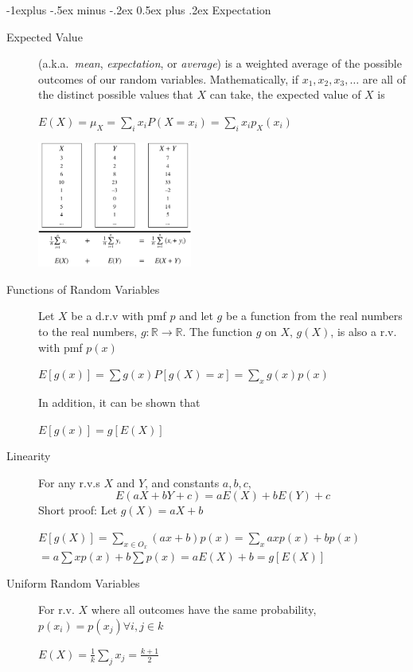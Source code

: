 \documentclass[10pt,landscape]{article}
\makeatletter
\renewcommand{\subsection}{\@startsection{subsection}{2}{0mm}%
                                {-1explus -.5ex minus -.2ex}%
                                {0.5ex plus .2ex}%
                                {\normalfont\normalsize\bfseries}}
\makeatother
\begin{document}
\begin{multicols}{3}
\subsection{Expectation}
\begin{description}

\item[Expected Value] (a.k.a.~\emph{mean}, \emph{expectation}, or \emph{average}) is a weighted average of the possible outcomes of our random variables. Mathematically, if $x_1, x_2, x_3, \dots$ are all of the distinct possible values that $X$ can take, the expected value of $X$ is
\begin{center}
$E(X) = \mu_X = \sum\limits_{i}x_iP(X=x_i) = \sum\limits_{i}x_ip_X(x_i)$
\end{center}

\begin{minipage}{\linewidth}
            \centering
\includegraphics[width=2in]{figures/linearity.pdf}
        \end{minipage}
        
\item[Functions of Random Variables] Let $X$ be a d.r.v with pmf $p$ and let $g$ be a function from the real numbers to the real numbers, $g:\mathbb{R} \rightarrow \mathbb{R}$. The function $g$ on $X$, $g(X)$, is also a r.v. with pmf $p(x)$
\begin{center}
$E[g(x)]=\sum g(x) P[g(X)=x] = \sum_{x} g(x)p(x)$
\end{center}
In addition, it can be shown that
\begin{center}
$E[g(x)]=g[E(X)]$
\end{center}
\item[Linearity] For any r.v.s $X$ and $Y$, and constants $a,b,c,$ 
\[E(aX + bY + c) = aE(X) + bE(Y) + c \]
Short proof: Let $g(X) = aX + b$
\begin{center}
$E[g(X)] = \sum_{x \in O_x} (ax+b)p(x) = \sum_x axp(x) + bp(x)$
$= a\sum xp(x) + b\sum p(x) = aE(X)+b = g[E(X)]$
\end{center}
\item[Uniform Random Variables] For r.v. $X$ where all outcomes have the same probability, $p(x_i)=p(x_j) \forall i,j \in k$
\begin{center}$E(X) = \frac{1}{k}{\sum_j x_j} = \frac{k+1}{2}$\end{center}


\end{description}
\end{multicols}
\end{document}
